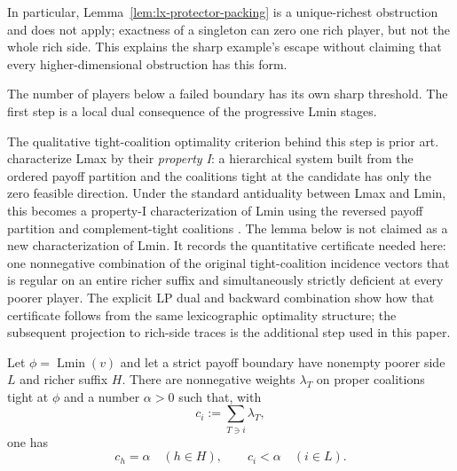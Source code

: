 In particular,
Lemma~\ref{lem:lx-protector-packing} is a unique-richest obstruction and does
not apply; exactness of a singleton can zero one rich player, but not the whole
rich side.  This explains the sharp example's escape without claiming that
every higher-dimensional obstruction has this form.

The number of players below a failed boundary has its own sharp threshold.
The first step is a local dual consequence of the progressive Lmin stages.

The qualitative tight-coalition optimality criterion behind this step is
prior art.  \citet[Lemma~1]{ArinKuipersVermeulen2008} characterize Lmax by
their \emph{property I}: a hierarchical system built from the ordered payoff
partition and the coalitions tight at the candidate has only the zero
feasible direction.  Under the standard antiduality between Lmax and Lmin,
this becomes a property-I characterization of Lmin using the reversed payoff
partition and complement-tight coalitions
\citep[Lemma~3]{Mauri2018}.  The lemma below is not claimed as a new
characterization of Lmin.  It records the quantitative certificate needed
here: one nonnegative combination of the original tight-coalition incidence
vectors that is regular on an entire richer suffix and simultaneously
strictly deficient at every poorer player.  The explicit LP dual and backward
combination show how that certificate follows from the same lexicographic
optimality structure; the subsequent projection to rich-side traces is the
additional step used in this paper.

\begin{lemma}
\label{lem:lx-strict-richer-cover}
Let $\phi=\operatorname{Lmin}(v)$ and let a strict payoff boundary have
nonempty poorer side $L$ and richer suffix $H$.  There are nonnegative
weights $\lambda_T$ on proper coalitions tight at $\phi$ and a number
$\alpha>0$ such that, with
\[
 c_i:=\sum_{T\ni i}\lambda_T,
\]
one has
\[
 c_h=\alpha\quad(h\in H),\qquad
 c_i<\alpha\quad(i\in L).                        \tag{SC}
 \label{eq:lx-strict-richer-cover}
\]
\end{lemma}

